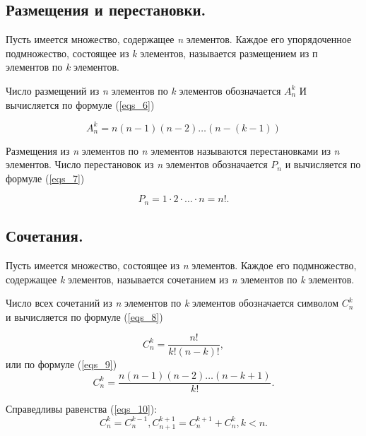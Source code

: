\documentclass{article}
\begin{document}
    \subsection*{Размещения и перестановки.}

    \fontsize{13}{10}\selectfont Пусть имеется множество, содержащее \textit{n} элементов. Каждое его упорядоченное подмножество, состоящее из \textit{k} элементов, называется размещением из п элементов по \textit{k} элементов.

    Число размещений из \textit{n} элементов по \textit{k} элементов обозначается $A_n^k$ И вычисляется по формуле (\ref{eqs_6})

    \begin{equation}
        \label{eqs_6}
        A_n^k=n(n-1)(n-2)\ldots(n-(k-1))
    \end{equation}

    Размещения из \textit{n} элементов по \textit{n} элементов называются перестановками из \textit{n} элементов. Число перестановок из \textit{n} элементов обозначается $P_n$ и вычисляется по формуле (\ref{eqs_7})

    \begin{equation}
        \label{eqs_7}
        P_n=1\cdot2\cdot\ldots\cdot n= n!.
    \end{equation}

    \subsection*{Сочетания.}

    Пусть имеется множество, состоящее из \textit{n} элементов. Каждое его подмножество, содержащее \textit{k} элементов, называется сочетанием из \textit{n}  элементов по \textit{k} элементов.

    Число всех сочетаний из \textit{n} элементов по \textit{k} элементов обозначается символом $C_n^k$ и вычисляется по формуле (\ref{eqs_8})

    \begin{equation}
        \label{eqs_8}
        C_n^k=\frac{n!}{k!(n-k)!},
    \end{equation}
    или по формуле (\ref{eqs_9})
    \begin{equation}
        \label{eqs_9}
        C_n^k=\frac{n(n-1)(n-2)\ldots(n-k+1)}{k!}.
    \end{equation}

    Справедливы равенства (\ref{eqs_10}):
    \begin{equation}
        \label{eqs_10}
        C_n^k=C_n^{k-1}, C_{n+1}^{k+1}=C_n^{k+1}+C_n^k, k < n.
    \end{equation}
\end{document}
